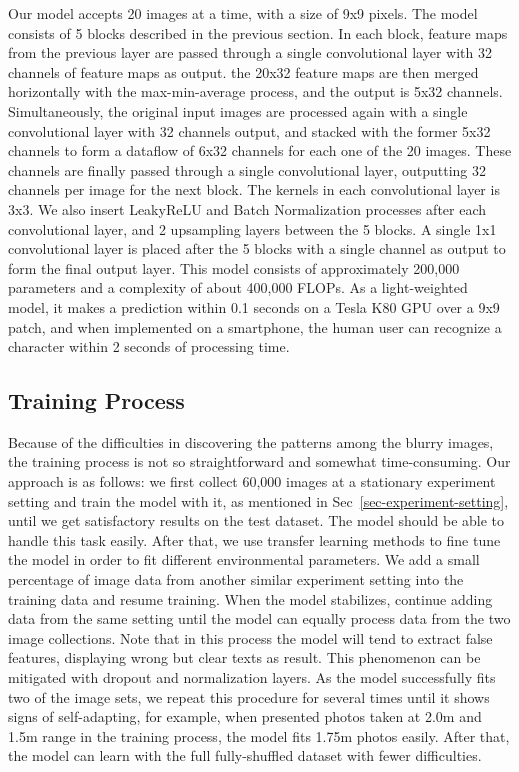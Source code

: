 Our model accepts 20 images at a time, with a size of 9x9 pixels. The model consists of 5 blocks described in the previous section. In each block, feature maps from the previous layer are passed through a single convolutional layer with 32 channels of feature maps as output. the 20x32 feature maps are then merged horizontally with the max-min-average process, and the output is 5x32 channels. Simultaneously, the original input images are processed again with a single convolutional layer with 32 channels output, and stacked with the former 5x32 channels to form a dataflow of 6x32 channels for each one of the 20 images. These channels are finally passed through a single convolutional layer, outputting 32 channels per image for the next block. The kernels in each convolutional layer is 3x3. We also insert LeakyReLU and Batch Normalization processes after each convolutional layer, and 2 upsampling layers between the 5 blocks. A single 1x1 convolutional layer is placed after the 5 blocks with a single channel as output to form the final output layer. This model consists of approximately 200,000 parameters and a complexity of about 400,000 FLOPs. As a light-weighted model, it makes a prediction within 0.1 seconds on a Tesla K80 GPU over a 9x9 patch, and when implemented on a smartphone, the human user can recognize a character within 2 seconds of processing time.

\subsection{Training Process}
Because of the difficulties in discovering the patterns among the blurry images, the training process is not so straightforward and somewhat time-consuming. Our approach is as follows: we first collect 60,000 images at a stationary experiment setting and train the model with it, as mentioned in Sec~\ref{sec-experiment-setting}, until we get satisfactory results on the test dataset. The model should be able to handle this task easily. After that, we use transfer learning methods to fine tune the model in order to fit different environmental parameters. We add a small percentage of image data from another similar experiment setting into the training data and resume training. When the model stabilizes, continue adding data from the same setting until the model can equally process data from the two image collections. Note that in this process the model will tend to extract false features, displaying wrong but clear texts as result. This phenomenon can be mitigated with dropout and normalization layers. As the model successfully fits two of the image sets, we repeat this procedure for several times until it shows signs of self-adapting, for example, when presented photos taken at 2.0m and 1.5m range in the training process, the model fits 1.75m photos easily. After that, the model can learn with the full fully-shuffled dataset with fewer difficulties.
